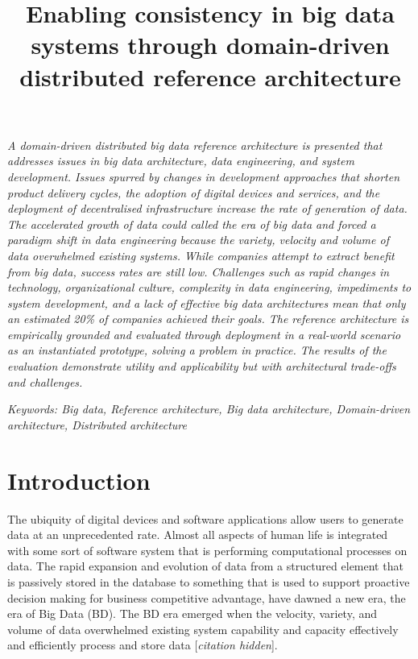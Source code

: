 \documentclass[a4paper,11pt]{article}
\title{Enabling consistency in big data systems through domain-driven distributed reference architecture}
\date{}
\let\cite\citep
\renewenvironment{abstract}
  {\quotation
  {\bfseries\noindent{\large\sffamily\abstractname}\par\nobreak\smallskip}    \noindent\itshape}
  {\endquotation}
\newcommand{\hc}{[\textit{citation hidden}]\textnormal{}}
\begin{document}
\maketitle{}
	 
\begin{abstract}
A domain-driven distributed big data reference architecture is presented that addresses issues in big data architecture, data engineering, and system development. Issues spurred by changes in development approaches that shorten product delivery cycles, the adoption of digital devices and services, and the deployment of decentralised infrastructure increase the rate of generation of data. The accelerated growth of data could called the era of big data and forced a paradigm shift in data engineering because the variety, velocity and volume of data overwhelmed existing systems. While companies attempt to extract benefit from big data, success rates are still low. Challenges such as rapid changes in technology, organizational culture, complexity in data engineering, impediments to system development, and a lack of effective big data architectures mean that only an estimated 20\%{} of companies achieved their goals.  The reference architecture is empirically grounded and evaluated through deployment in a real-world scenario as an instantiated prototype, solving a problem in practice. The results of the evaluation demonstrate utility and applicability but with architectural trade-offs and challenges.
\end{abstract}


\noindent{}\emph{Keywords: Big data, Reference architecture, Big data architecture, Domain-driven architecture, Distributed architecture}


\section{Introduction}
\nobreak{}
The ubiquity of digital devices and software applications allow users to generate data at an unprecedented rate. Almost all aspects of human life is integrated with some sort of software system that is performing computational processes on data. The rapid expansion and evolution of data from a structured element that is passively stored in the database to something that is used to support proactive decision making for business
competitive advantage, have dawned a new era, the era of Big Data (BD). The BD era emerged when the velocity, variety, and volume of data overwhelmed existing system capability and capacity effectively and efficiently process and store data 
\hc{}. 
\end{document}
